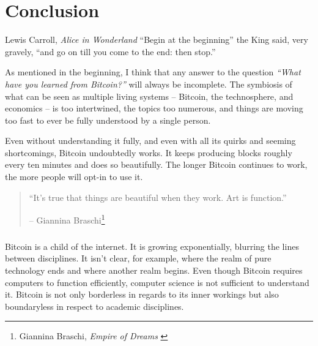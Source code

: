 \label{ch:conclusion}

\chapter*{Conclusion}

\begin{chapquote}{Lewis Carroll, \textit{Alice in Wonderland}}
\enquote{Begin at the beginning} the King said, very gravely, \enquote{and go on till you
come to the end: then stop.}
\end{chapquote}

As mentioned in the beginning, I think that any answer to the
question \textit{“What have you learned from Bitcoin?”} will always be incomplete. The
symbiosis of what can be seen as multiple living systems -- Bitcoin, the
technosphere, and economics -- is too intertwined, the topics too numerous, and
things are moving too fast to ever be fully understood by a single person.

Even without understanding it fully, and even with all its quirks and seeming
shortcomings, Bitcoin undoubtedly works. It keeps producing blocks roughly every
ten minutes and does so beautifully. The longer Bitcoin continues to work, the
more people will opt-in to use it.

\begin{quotation}\begin{samepage}
\enquote{It's true that things are beautiful when they work. Art is function.}
\begin{flushright} -- Giannina Braschi\footnote{Giannina Braschi, \textit{Empire of Dreams} \cite{braschi2011empire}}
\end{flushright}\end{samepage}\end{quotation}

\paragraph{} Bitcoin is a child of the internet. It is growing exponentially,
blurring the lines between disciplines. It isn’t clear, for example, where the
realm of pure technology ends and where another realm begins. Even though
Bitcoin requires computers to function efficiently, computer science is not
sufficient to understand it. Bitcoin is not only borderless in regards to its
inner workings but also boundaryless in respect to academic disciplines.

